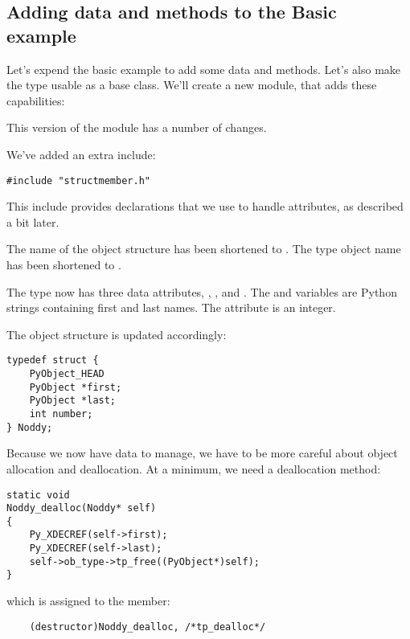 \subsection{Adding data and methods to the Basic example}

Let's expend the basic example to add some data and methods.  Let's
also make the type usable as a base class. We'll create
a new module,  that adds these capabilities:



This version of the module has a number of changes.

We've added an extra include:

\begin{verbatim}
#include "structmember.h"
\end{verbatim}

This include provides declarations that we use to handle attributes,
as described a bit later.

The name of the  object structure has been shortened to
.  The type object name has been shortened to
.

The   type now has three data attributes, ,
, and .  The  and 
variables are Python strings containing first and last names. The
 attribute is an integer.

The object structure is updated accordingly:

\begin{verbatim}
typedef struct {
    PyObject_HEAD
    PyObject *first;
    PyObject *last;
    int number;
} Noddy;
\end{verbatim}

Because we now have data to manage, we have to be more careful about
object allocation and deallocation.  At a minimum, we need a
deallocation method:

\begin{verbatim}
static void
Noddy_dealloc(Noddy* self)
{
    Py_XDECREF(self->first);
    Py_XDECREF(self->last);
    self->ob_type->tp_free((PyObject*)self);
}
\end{verbatim}

which is assigned to the  member:

\begin{verbatim}
    (destructor)Noddy_dealloc, /*tp_dealloc*/
\end{verbatim}

